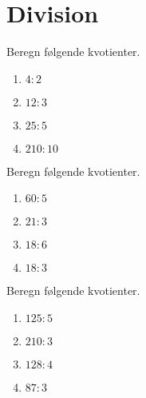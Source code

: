 \documentclass[../main.tex]{subfiles}
\begin{document}
\section{Division}

\begin{prob}
    Beregn følgende kvotienter.
    \begin{enumerate}[label=\alph*)]
        \item \(\displaystyle 4 : 2\)
        \vspace{3mm}
        \item \(\displaystyle 12 : 3\)
        \vspace{3mm}
        \item \(\displaystyle 25 : 5\)
        \vspace{3mm}
        \item \(\displaystyle 210 : 10\)
    \end{enumerate}
\end{prob}

\begin{prob}
    Beregn følgende kvotienter.
    \begin{enumerate}[label=\alph*)]
        \item \(\displaystyle 60 : 5\)
        \vspace{3mm}
        \item \(\displaystyle 21 : 3\)
        \vspace{3mm}
        \item \(\displaystyle 18 : 6\)
        \vspace{3mm}
        \item \(\displaystyle 18 : 3\)
    \end{enumerate}
\end{prob}

\begin{prob}
    Beregn følgende kvotienter.
    \begin{enumerate}[label=\alph*)]
        \item \(\displaystyle 125 : 5\)
        \vspace{3mm}
        \item \(\displaystyle 210 : 3\)
        \vspace{3mm}
        \item \(\displaystyle 128 : 4\)
        \vspace{3mm}
        \item \(\displaystyle 87 : 3\)
    \end{enumerate}
\end{prob}
\end{document}

